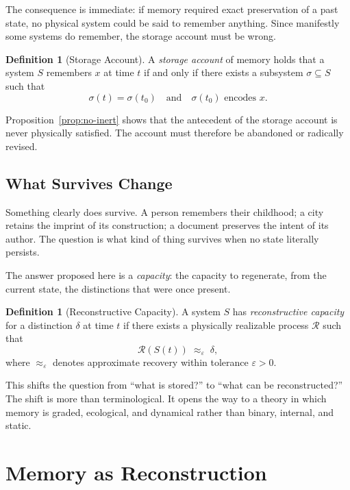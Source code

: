 \documentclass[12pt, oneside]{book}
\theoremstyle{plain}
\theoremstyle{definition}
\newtheorem{definition}[theorem]{Definition}
\theoremstyle{remark}
\begin{document}
The consequence is immediate: if memory required exact preservation
of a past state, no physical system could be said to remember
anything.
Since manifestly some systems do remember, the storage account
must be wrong.

\begin{definition}[Storage Account]
A \emph{storage account} of memory holds that a system $S$
remembers $x$ at time $t$ if and only if there exists a
subsystem $\sigma \subseteq S$ such that
\[
  \sigma(t) = \sigma(t_0)
  \quad\text{and}\quad
  \sigma(t_0) \text{ encodes } x.
\]
\end{definition}

Proposition~\ref{prop:no-inert} shows that the antecedent
of the storage account is never physically satisfied.
The account must therefore be abandoned or radically revised.

\section{What Survives Change}

Something clearly does survive.
A person remembers their childhood; a city retains the imprint
of its construction; a document preserves the intent of its
author.
The question is what kind of thing survives when no state
literally persists.

The answer proposed here is a \emph{capacity}:
the capacity to regenerate, from the current state, the
distinctions that were once present.

\begin{definition}[Reconstructive Capacity]
\label{def:recon-capacity}
A system $S$ has \emph{reconstructive capacity} for
a distinction $\delta$ at time $t$ if there exists a
physically realizable process
$\mathcal{R}$
such that
\[
  \mathcal{R}(S(t)) \;\approx_\varepsilon\; \delta,
\]
where $\approx_\varepsilon$ denotes approximate recovery
within tolerance $\varepsilon > 0$.
\end{definition}

This shifts the question from ``what is stored?'' to
``what can be reconstructed?''
The shift is more than terminological.
It opens the way to a theory in which memory is graded,
ecological, and dynamical rather than binary, internal,
and static.

\chapter{Memory as Reconstruction}
\end{document}
